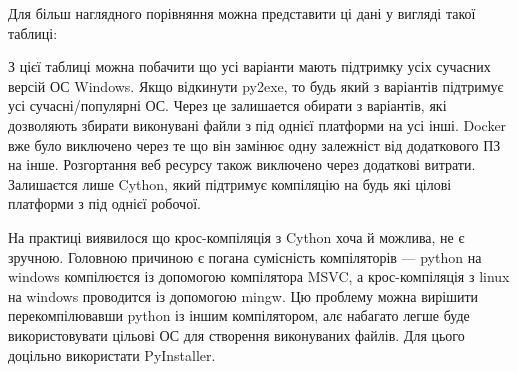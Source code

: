 \documentclass[14pt]{extarticle}
\begin{document}
  Для більш наглядного порівняння можна представити ці дані
  у вигляді такої таблиці:

  \begin{table}
    \centering
  \end{table}

  \newpage
  З цієї таблиці можна побачити що усі варіанти мають
  підтримку усіх сучасних версій ОС Windows.
  Якщо відкинути py2exe,
  то будь який з варіантів підтримує усі сучасні/популярні ОС.
  Через це залишается обирати з варіантів,
  які дозволяють збирати виконувані файли з під однієї платформи на усі інші.
  Docker вже було виключено через
  те що він замінює одну залежніст від додаткового ПЗ на інше.
  Розгортання веб ресурсу також виключено через додаткові витрати.
  Залишаєтся лише Cython, який підтримує компіляцію на
  будь які цілові платформи з під однієї робочої.

  На практиці виявилося що крос-компіляція з Cython хоча й можлива,
  не є зручною. Головною причиною є погана сумісність компіляторів ---
  python на windows компілюєтся із допомогою компілятора MSVC,
  а крос-компіляція з linux на windows проводится із допомогою mingw.
  Цю проблему можна вирішити перекомпілювавши python із іншим компілятором,
  алє набагато легше буде використовувати цільові ОС для створення
  виконуваних файлів. Для цього доцільно використати PyInstaller.
\end{document}
